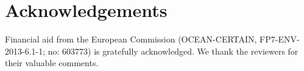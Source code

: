 \documentclass[10pt, a4paper]{article}
\begin{document}
 
\section{Acknowledgements}

Financial aid from the European Commission (OCEAN-CERTAIN, FP7-ENV-2013-6.1-1; no: 603773) is gratefully acknowledged. 
We thank the reviewers for their valuable comments. 



\end{document}
